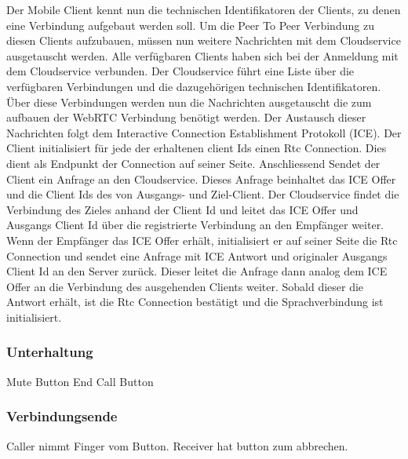 Der Mobile Client kennt nun die technischen Identifikatoren der Clients, zu denen eine Verbindung aufgebaut werden soll.
Um die Peer To Peer Verbindung zu diesen Clients aufzubauen, müssen nun weitere Nachrichten mit dem Cloudservice ausgetauscht werden.
Alle verfügbaren Clients haben sich bei der Anmeldung mit dem Cloudservice verbunden.
Der Cloudservice führt eine Liste über die verfügbaren Verbindungen und die dazugehörigen technischen Identifikatoren.
Über diese Verbindungen werden nun die Nachrichten ausgetauscht die zum aufbauen der WebRTC Verbindung benötigt werden.
Der Austausch dieser Nachrichten folgt dem Interactive Connection Establishment Protokoll (ICE).
Der Client initialisiert für jede der erhaltenen client Ids einen Rtc Connection.
Dies dient als Endpunkt der Connection auf seiner Seite.
Anschliessend Sendet der Client ein Anfrage an den Cloudservice.
Dieses Anfrage beinhaltet das ICE Offer und die Client Ids des von Ausgangs- und Ziel-Client.
Der Cloudservice findet die Verbindung des Zieles anhand der Client Id und leitet das ICE Offer und Ausgangs Client Id über die registrierte Verbindung an den Empfänger weiter.
Wenn der Empfänger das ICE Offer erhält, initialisiert er auf seiner Seite die Rtc Connection und sendet eine Anfrage mit ICE Antwort und originaler Ausgangs Client Id an den Server zurück.
Dieser leitet die Anfrage dann analog dem ICE Offer an die Verbindung des ausgehenden Clients weiter.
Sobald dieser die Antwort erhält, ist die Rtc Connection bestätigt und die Sprachverbindung ist initialisiert.

\clearpage
\subsubsection{Unterhaltung}

Mute Button
End Call Button


\subsubsection{Verbindungsende}

Caller nimmt Finger vom Button.
Receiver hat button zum abbrechen.

\clearpage
